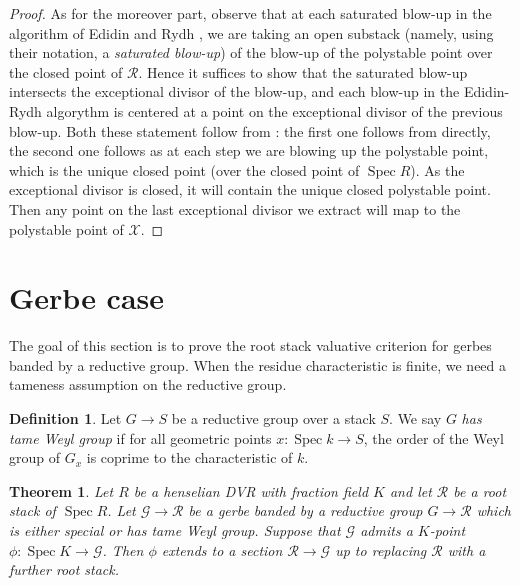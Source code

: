 \documentclass{amsart}
\newtheorem{theorem}{Theorem}[section]
\theoremstyle{definition}
\newtheorem{definition}[definition]{Definition}
\newtheorem{remark}[remark]{Remark}
\newcommand{\cG}{\mathcal{G}}
\newcommand{\cX}{\mathcal{X}}
\newcommand{\cR}{\mathcal{R}}
\DeclareMathOperator{\GL}{GL}
\newcommand{\spec}{\operatorname{Spec}}
\newcommand{\dori}[1]{{\color{blue}[[\ensuremath{\clubsuit\clubsuit\clubsuit} #1]]}}
\newcommand{\dori}[1]{}
\begin{document}
\begin{proof}
As for the moreover part, observe that at each saturated blow-up in the algorithm of Edidin and Rydh \cite{ER}, we are taking an open substack (namely, using their notation, a \textit{saturated blow-up}) of the blow-up of the polystable point over the closed point of $\cR$. Hence it suffices to show that the saturated blow-up intersects the exceptional divisor of the blow-up, and each blow-up in the Edidin-Rydh algorythm is centered at a point on the exceptional divisor of the previous blow-up. Both these statement follow from \cite[Proposition 3.7 (3)]{ER}: the first one follows from \cite[Proposition 3.7 (3)]{ER} directly, the second one follows as at each step we are blowing up the polystable point, which is the unique closed point (over the closed point of $\spec R$). As the exceptional divisor is closed, it will contain the unique closed polystable point. Then any point on the last exceptional divisor we extract will map to the polystable point of $\cX$.
\end{proof}





\section{Gerbe case}
The goal of this section is to prove the root stack valuative criterion for gerbes banded by a reductive group. When the residue characteristic is finite, we need a tameness assumption on the reductive group. 

\begin{definition}\label{def_tame} Let $G \to S$ be a reductive group over a stack  $S$. We say $G$ \textit{has tame Weyl group} if for all geometric points $x : \spec k \to S$, the order of the Weyl group of $G_x$ is coprime to the characteristic of $k$.
\end{definition}

\begin{theorem}\label{thm_case_of_gerbe_over_root_stack}
    Let $R$ be a henselian DVR with fraction field $K$ and let $\cR$ be a root stack of $\spec R$. Let $\cG\to \cR$ be a gerbe banded by a reductive group $G \to \cR$ which is either special or has tame Weyl group. Suppose that $\cG$ admits a $K$-point $\phi: \spec K \to \cG$. Then $\phi$ extends to a section $\cR \to \cG$ up to replacing $\cR$ with a further root stack. 
\end{theorem}

\begin{comment}
\begin{remark}
    Note that the tameness assumption is not necessarily optimal. \dori{check if tamenss + special is optimal?} For example, if $\cG = BG$ and $G$ is special (e.g. $G = \GL_n$), then any $\phi$ corresponds to the trivial torsor and so it automatically extends. On the other hand, some assumption on $G$ is neccessary. See the following example.
\end{remark}
\end{comment}
\end{document}
